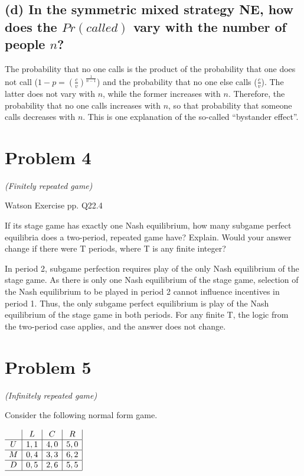 \documentclass{article}
\begin{document}
\subsection*{(d) In the symmetric mixed strategy NE, how does the $Pr(called)$ vary with the number of people $n$?}  

The probability that no one calls is the product of the probability that one does not call ($1 - p = \left( \tfrac{c}{v} \right)^\frac1{n-1}$) and the probability that no one else calls ($\tfrac{c}{v}$). The latter does not vary with $n$, while the former increases with $n$. Therefore, the probability that no one calls increases with $n$, so that probability that someone calls decreases with $n$. This is one explanation of the so-called ``bystander effect''.
%



\section{Problem 4} \textit{(Finitely repeated game)}

Watson Exercise pp. Q22.4 

If its stage game has exactly one Nash equilibrium, how many subgame
perfect equilibria does a two-period, repeated game have? Explain. Would
your answer change if there were T periods, where T is any finite integer?



In period 2, subgame perfection requires play of the only Nash equilibrium
of the stage game. As there is only one Nash equilibrium of the stage game,
selection of the Nash equilibrium to be played in period 2 cannot influence
incentives in period 1. Thus, the only subgame perfect equilibrium is play
of the Nash equilibrium of the stage game in both periods. For any finite
T, the logic from the two-period case applies, and the answer does not
change.



\section{Problem 5} \textit{(Infinitely repeated game)}

Consider the following normal form game.

\begin{center}
$
\begin{array}{c|c|c|c|}
& L & C & R \\
\hline
U & 1,1 & 4,0 & 5,0 \\
\hline
M & 0,4 & 3,3 & 6,2 \\
\hline
D & 0,5 & 2,6 & 5,5 \\
\hline\end{array}
$
\end{center}
\end{document}
